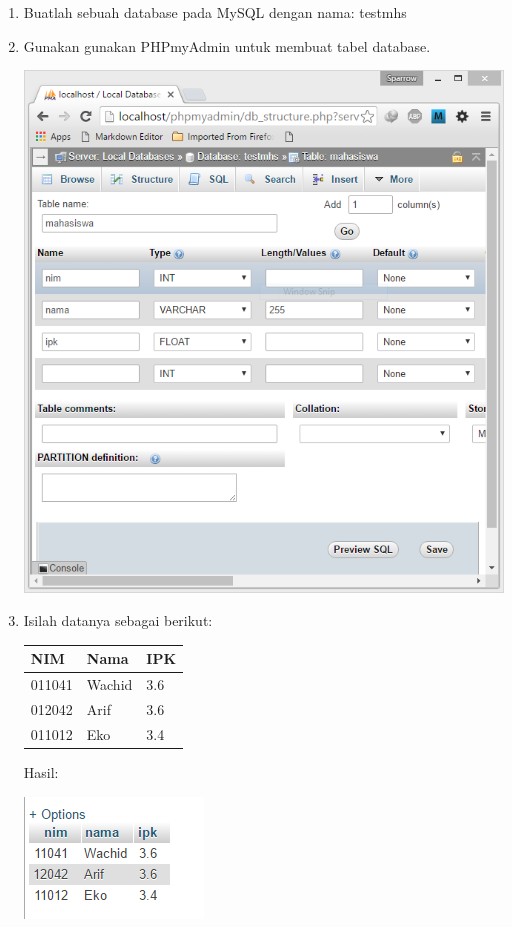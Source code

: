 \begin{enumerate}


\item
  Buatlah sebuah database pada MySQL dengan nama: testmhs
\item
  Gunakan gunakan PHPmyAdmin untuk membuat tabel database.
  
  \includegraphics[width=0.7\linewidth]{images/phpmyadmin}
  
\item
  Isilah datanya sebagai berikut:

\begin{longtable}[]{@{}lll@{}}
\toprule
NIM & Nama & IPK\tabularnewline
\midrule
\endhead
011041 & Wachid & 3.6\tabularnewline
012042 & Arif & 3.6\tabularnewline
011012 & Eko & 3.4\tabularnewline
\bottomrule
\end{longtable}

Hasil:

\includegraphics[width=0.7\linewidth]{images/database-mhs}


\end{enumerate}
